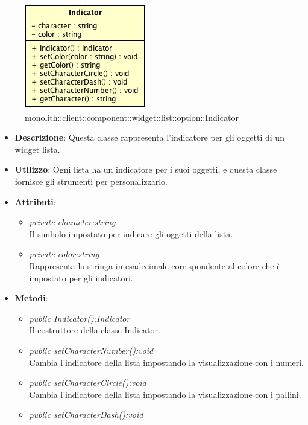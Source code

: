 \label{monolith::client::component::widget::list::option::Indicator}
\begin{figure}[H]
	\centering
	\includegraphics[scale=0.5]{Sezioni/SottosezioniST/img/Indicator.png}
	\caption{monolith::client::component::widget::list::option::Indicator}
\end{figure}

\begin{itemize}
\item \textbf{Descrizione}: Questa classe rappresenta l'indicatore per gli oggetti di un widget lista.
\item \textbf{Utilizzo}: Ogni lista ha un indicatore per i suoi oggetti, e questa classe fornisce gli strumenti per personalizzarlo.
\item \textbf{Attributi}:
	\begin{itemize}
	\item \textit{private character:string}\\
	Il simbolo impostato per indicare gli oggetti della lista.
	\item \textit{private color:string}\\
	Rappresenta la stringa in esadecimale corrispondente al colore che è impostato per gli indicatori.
	\end{itemize}
\item \textbf{Metodi}:
	\begin{itemize}
	\item \textit{public Indicator():Indicator}\\
	Il costruttore della classe Indicator.
	\item \textit{public setCharacterNumber():void}\\
	Cambia l'indicatore della lista impostando la visualizzazione con i numeri.
	\item \textit{public setCharacterCircle():void}\\
	Cambia l'indicatore della lista impostando la visualizzazione con i pallini.
	\item \textit{public setCharacterDash():void}\\

\end{itemize}
\end{itemize}
